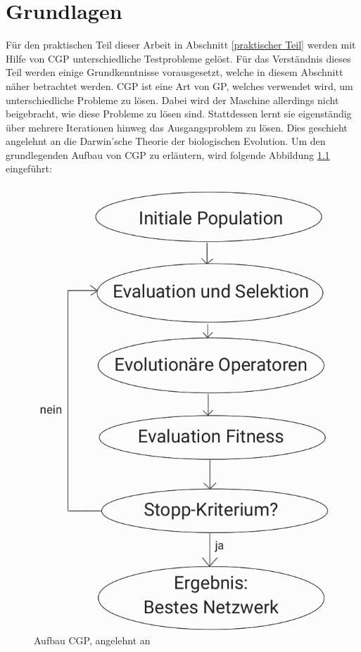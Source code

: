 \chapter{Grundlagen}
\label{Grundlagen}

Für den praktischen Teil dieser Arbeit in Abschnitt \ref{praktischer Teil} werden mit Hilfe von CGP unterschiedliche Testprobleme gelöst. 
Für das Verständnis dieses Teil werden einige Grundkenntnisse vorausgesetzt, welche in diesem Abschnitt näher betrachtet werden.\newline
CGP ist eine Art von GP, welches verwendet wird, um unterschiedliche Probleme zu lösen.
Dabei wird der Maschine allerdings nicht beigebracht, wie diese Probleme zu lösen sind.
Stattdessen lernt sie eigenständig über mehrere Iterationen hinweg das Ausgangsproblem zu lösen.
Dies geschieht angelehnt an die Darwin’sche Theorie der biologischen Evolution. \cite{milad_taleby_ahvanooey_survey_2019} \newline
Um den grundlegenden Aufbau von CGP zu erläutern, wird folgende Abbildung \ref{fig:aufbauCGP} eingeführt:

\begin{figure}[H]
    \centering
    \includegraphics[scale = 0.52]{Bilder/AufbauCGPVorgehenNachbildung.png}
    \caption{Aufbau CGP, angelehnt an \cite{torabi_using_2022}}
    \label{fig:aufbauCGP}
\end{figure}

